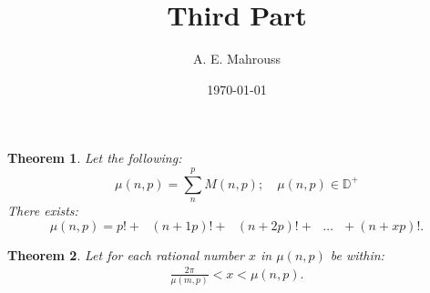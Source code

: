 \documentclass[10pt]{article}
\title{%
  \vspace{-1.5em}%
  \large\textbf{Third Part}%
}
\author{A. E. Mahrouss}
\date{\today}
\theoremstyle{plain}
\newtheorem{theorem}{Theorem}[section]
\theoremstyle{definition}
\theoremstyle{remark}
\begin{document}
\begin{theorem}
	Let the following:
\begin{equation}
    \mu(n, p) = \sum_{n}^{p} M(n, p); \quad \mu(n, p) \in \mathbb{D}^{+}
\end{equation}
There exists:
\begin{equation}
    \mu(n, p) = p! + \text{ } (n+1p)! + \text{ } (n+2p)! + \text{ } \dots \text{ } + (n+xp)!.
\end{equation}
\end{theorem}

\begin{theorem}
	Let for each rational number $x$ in $\mu(n, p)$ be within:
	\begin{align*}
		\frac{2\pi}{\mu(m, p)} < x < \mu(n, p).
	\end{align*}
\end{theorem}

\nocite{*}


\end{document}
